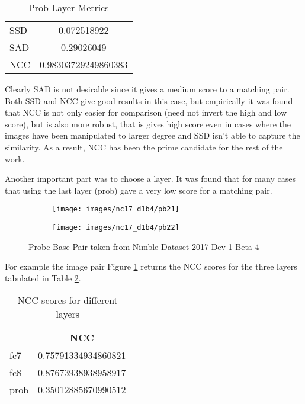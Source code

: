 \documentclass{article}
\begin{document}
\begin{table}[H]
  \centering
\caption{Prob Layer Metrics}
\label{pb_metrics}
\begin{tabular}{|l|S[round-precision=2]|}
  \hline
  & \\
  \hline
  SSD & 0.072518922         \\
  SAD & 0.29026049          \\
  NCC & 0.98303729249860383 \\
  \hline
\end{tabular}
\end{table}

Clearly SAD is not desirable since it gives a medium score to a matching pair. Both SSD and NCC give good results in this case, but empirically it was found that NCC is not only easier for comparison (need not invert the high and low score), but is also more robust, that is gives high score even in cases where the images have been manipulated to larger degree and SSD isn't able to capture the similarity. As a result, NCC has been the prime candidate for the rest of the work.

Another important part was to choose a layer. It was found that for many cases that using the last layer (prob) gave a very low score for a matching pair.

\begin{figure}[H]
  \centering
  \begin{subfigure}[t]{0.5\textwidth}
    \centering
    \texttt{[image: images/nc17\_d1b4/pb21]}
  \end{subfigure}
  \begin{subfigure}[t]{0.45\textwidth}
    \centering
    \texttt{[image: images/nc17\_d1b4/pb22]}
  \end{subfigure}
  \caption{Probe Base Pair taken from Nimble Dataset 2017 Dev 1 Beta 4}
  \label{fig:fc8_good}
\end{figure}

For example the image pair Figure \ref{fig:fc8_good} returns the  NCC scores for the three layers tabulated in Table \ref{ncc_layers}.
\begin{table}[H]
  \centering
\caption{NCC scores for different layers}
\label{ncc_layers}
\begin{tabular}{|l|S[round-precision=2]|}
  \hline
  & NCC                 \\
  \hline
  fc7  & 0.75791334934860821 \\
  fc8  & 0.87673938938958917 \\
  prob & 0.35012885670990512 \\
  \hline
\end{tabular}
\end{table}
\end{document}
